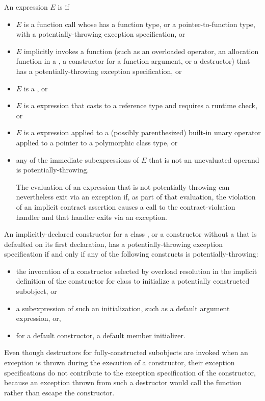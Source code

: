 \pnum
An expression $E$ is
 if
\begin{itemize}
\item
$E$ is a function call
whose 
has a function type,
or a pointer-to-function type,
with a potentially-throwing exception specification,
or
\item
$E$ implicitly invokes a function
(such as an overloaded operator,
an allocation function in a ,
a constructor for a function argument,
or a destructor)
that has a potentially-throwing exception specification,
or
\item
$E$ is a ,
or
\item
$E$ is a  expression that casts to a reference type and
requires a runtime check,
or
\item
$E$ is a  expression applied to a
(possibly parenthesized) built-in unary \tcode{*} operator
applied to a pointer to a
polymorphic class type,
or
\item
any of the immediate subexpressions
of $E$ that is not an unevaluated operand is potentially-throwing.
\begin{note}
The evaluation of an expression
that is not potentially-throwing
can nevertheless exit via an exception
if, as part of that evaluation,
the violation of an implicit contract assertion
causes a call to the contract-violation handler
and that handler exits via an exception.
\end{note}
\end{itemize}

\pnum
An implicitly-declared constructor for a class ,
or a constructor without a 
that is defaulted on its first declaration,
has a potentially-throwing exception specification
if and only if
any of the following constructs is potentially-throwing:
\begin{itemize}
\item
the invocation of a constructor selected by overload resolution
in the implicit definition of the constructor
for class 
to initialize a potentially constructed subobject, or
\item
a subexpression of such an initialization,
such as a default argument expression, or,
\item
for a default constructor, a default member initializer.
\end{itemize}
\begin{note}
Even though destructors for fully-constructed subobjects
are invoked when an exception is thrown
during the execution of a constructor,
their exception specifications do not contribute
to the exception specification of the constructor,
because an exception thrown from such a destructor
would call the function 
rather than escape the constructor.
\end{note}

